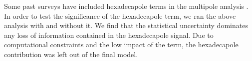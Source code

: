 \documentclass[iop,twocolappendix]{emulateapj}
\begin{document}

Some past surveys have included hexadecapole terms in the multipole analysis \citep{XuCuesta2013}. In order to test the significance of the hexadecapole term, we ran the above analysis with and without it. We find that the statistical uncertainty dominates any loss of information contained in the hexadecapole signal. Due to computational constraints and the low impact of the term, the hexadecapole contribution was left out of the final model.
\end{document}

